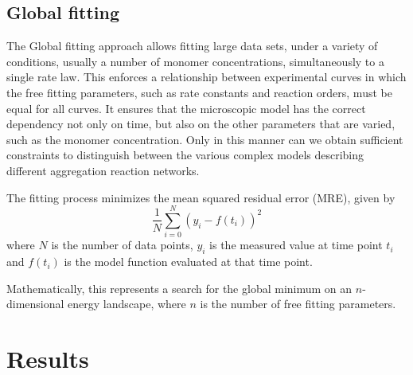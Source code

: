 \documentclass[11pt,a4paper]{article}
\begin{document}
\subsection{Global fitting}\label{global_fit}
The Global fitting approach allows fitting large data sets, under a variety of conditions, usually a number of monomer concentrations, simultaneously to a single rate law. This enforces a relationship between experimental curves in which the free fitting parameters, such as rate constants and reaction orders, must be equal for all curves.
It ensures that the microscopic model has the correct dependency not only on time, but also on the other parameters that are varied, such as
the monomer concentration. Only in this manner can we obtain sufficient constraints to distinguish between the various complex models describing different aggregation reaction networks.

The fitting process minimizes the mean squared residual error
(MRE), given by   \[\frac{1}{N} \sum_{i=0}^N{(y_i - f(t_i))^2} \]
where $N$ is the number of data points, $y_i$ is the measured value
at time point $t_i$ and $f(t_i)$  is the model function evaluated at that
time point.

Mathematically, this represents a search for the global minimum on an $n$-dimensional energy landscape, where $n$ is the number of free fitting parameters.

\section{Results}\label{res}
\end{document}
